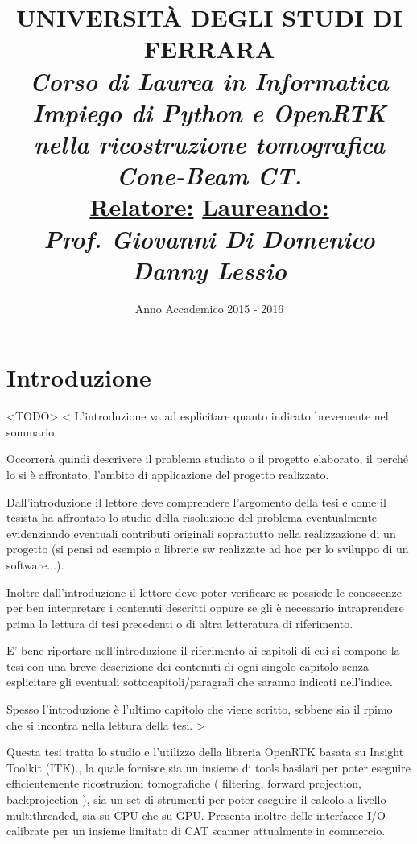\documentclass[a4paper,12pt, doubleside]{report}
\title{\textbf{UNIVERSITÀ DEGLI STUDI DI FERRARA\\}
\bigskip
\textit{Corso di Laurea in Informatica}\\
\bigskip
\bigskip
\bigskip
\bigskip
\bigskip
\bigskip
\bigskip
\bigskip
\bigskip
\bigskip
\bigskip
\bigskip
\bigskip
\bigskip
\bigskip
\bigskip
\textit{\textbf{Impiego di Python e OpenRTK nella ricostruzione tomografica Cone-Beam CT.\\}}
\bigskip
\bigskip
\bigskip
\bigskip
\bigskip
\bigskip
\bigskip
\bigskip
\bigskip
\bigskip
\bigskip
\bigskip
\bigskip
\bigskip
\bigskip
\bigskip
\bigskip
\bigskip
\bigskip
\bigskip
\bigskip
\textbf{\underline{Relatore:}}
\hfill
\textbf{\underline{Laureando:}\thinspace\thinspace\thinspace} \\
\textit{Prof. Giovanni Di Domenico}
\hfill
\textit{Danny Lessio}
\bigskip
\bigskip
\bigskip
\bigskip
\bigskip
\bigskip
\bigskip
\bigskip
\bigskip
}
\date{Anno Accademico 2015 - 2016}
\begin{document}
    \maketitle
    \newpage

    \chapter*{Introduzione}
        \par
            <TODO>
            <
        		L'introduzione va ad esplicitare quanto indicato brevemente nel sommario.
        
        		Occorrerà quindi descrivere il problema studiato o il progetto elaborato, il perché lo si è affrontato, l'ambito di applicazione del progetto realizzato.
        
        		Dall'introduzione il lettore deve comprendere l'argomento della tesi e come il tesista ha affrontato lo studio della risoluzione del problema eventualmente evidenziando eventuali contributi originali soprattutto nella realizzazione di un progetto (si pensi ad esempio a librerie sw realizzate ad hoc per lo sviluppo di un software...).
        
        		Inoltre dall'introduzione il lettore deve poter verificare se possiede le conoscenze per ben interpretare i contenuti descritti oppure se gli è necessario intraprendere prima la lettura di tesi precedenti o di altra letteratura di riferimento.
        
        		E' bene riportare nell'introduzione il riferimento ai capitoli di cui si compone la tesi con una breve descrizione dei contenuti di ogni singolo capitolo senza esplicitare gli eventuali sottocapitoli/paragrafi che saranno indicati nell'indice.
        
        		Spesso l'introduzione è l'ultimo capitolo che viene scritto, sebbene sia il rpimo che si incontra nella lettura della tesi.
        	>
        \par
            Questa tesi tratta lo studio e l'utilizzo della libreria OpenRTK \cite{openrtk-website} basata su Insight Toolkit (ITK).\cite{itk-website}, la quale fornisce sia un insieme di tools basilari per poter eseguire efficientemente ricostruzioni tomografiche ( filtering, forward projection, backprojection ), sia un set di strumenti per poter eseguire il calcolo a livello multithreaded, sia su CPU che su GPU. Presenta inoltre delle interfacce I/O calibrate per un insieme limitato di CAT scanner attualmente in commercio.
    
\end{document}
